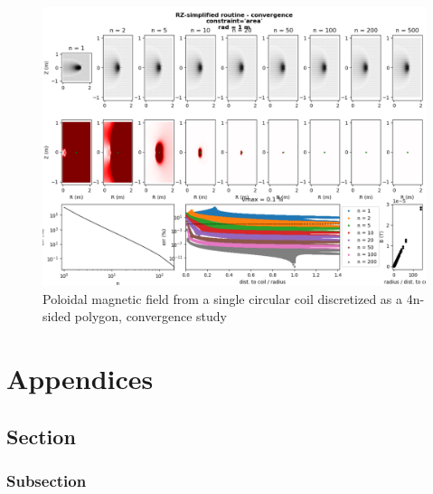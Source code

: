 \documentclass[a4paper,11pt,twoside,titlepage,openright]{book}
\numberwithin{equation}{section}
\begin{document}
\begin{figure}[hbtp]
    \centering
    \includegraphics[scale=0.50]{Fig04_SimplifiedRZ_Convergence.pdf} 
    \caption{\small Poloidal magnetic field from a single circular coil
    discretized as a 4n-sided polygon, convergence study}
   \label{Fig:Convergence}  
\end{figure}








\appendix
\chapter{Appendices}

\section{Section}
\subsection{Subsection}
\end{document}
